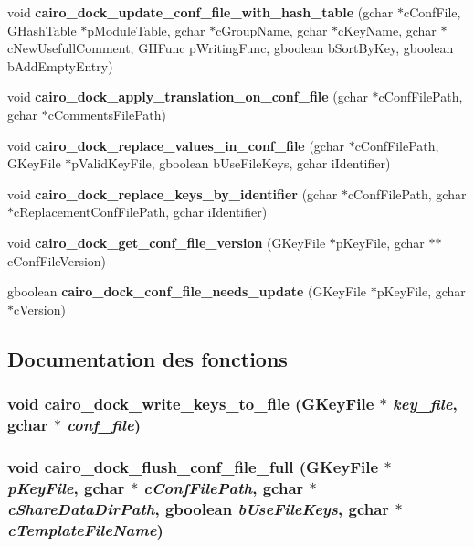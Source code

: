 \begin{CompactItemize}
\item 
void {\bf cairo\_\-dock\_\-update\_\-conf\_\-file\_\-with\_\-hash\_\-table} (gchar $\ast$cConfFile, GHashTable $\ast$pModuleTable, gchar $\ast$cGroupName, gchar $\ast$cKeyName, gchar $\ast$cNewUsefullComment, GHFunc pWritingFunc, gboolean bSortByKey, gboolean bAddEmptyEntry)
\item 
void {\bf cairo\_\-dock\_\-apply\_\-translation\_\-on\_\-conf\_\-file} (gchar $\ast$cConfFilePath, gchar $\ast$cCommentsFilePath)
\item 
void {\bf cairo\_\-dock\_\-replace\_\-values\_\-in\_\-conf\_\-file} (gchar $\ast$cConfFilePath, GKeyFile $\ast$pValidKeyFile, gboolean bUseFileKeys, gchar iIdentifier)
\item 
void {\bf cairo\_\-dock\_\-replace\_\-keys\_\-by\_\-identifier} (gchar $\ast$cConfFilePath, gchar $\ast$cReplacementConfFilePath, gchar iIdentifier)
\item 
void {\bf cairo\_\-dock\_\-get\_\-conf\_\-file\_\-version} (GKeyFile $\ast$pKeyFile, gchar $\ast$$\ast$cConfFileVersion)
\item 
gboolean {\bf cairo\_\-dock\_\-conf\_\-file\_\-needs\_\-update} (GKeyFile $\ast$pKeyFile, gchar $\ast$cVersion)
\end{CompactItemize}


\subsection{Documentation des fonctions}
\subsubsection{\setlength{\rightskip}{0pt plus 5cm}void cairo\_\-dock\_\-write\_\-keys\_\-to\_\-file (GKeyFile $\ast$ {\em key\_\-file}, gchar $\ast$ {\em conf\_\-file})}\label{cairo-dock-keyfile-manager_8h_aaa94db45ddc28158e057ed71ae0b6d4}


\subsubsection{\setlength{\rightskip}{0pt plus 5cm}void cairo\_\-dock\_\-flush\_\-conf\_\-file\_\-full (GKeyFile $\ast$ {\em pKeyFile}, gchar $\ast$ {\em cConfFilePath}, gchar $\ast$ {\em cShareDataDirPath}, gboolean {\em bUseFileKeys}, gchar $\ast$ {\em cTemplateFileName})}\label{cairo-dock-keyfile-manager_8h_ffa76b0ccbb587026cb43fd587a809bb}


